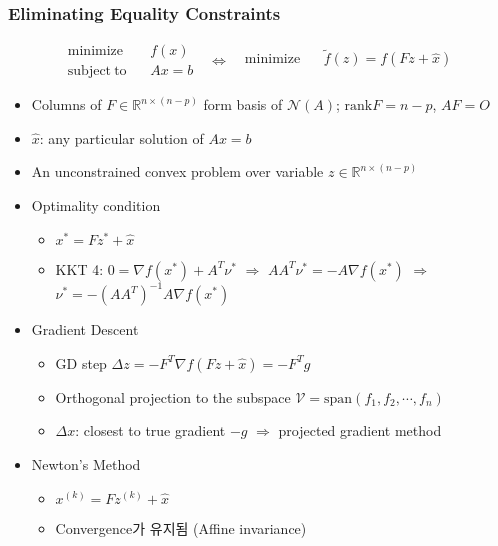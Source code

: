 \subsubsection*{Eliminating Equality Constraints}
$$ \begin{aligned}
    \mathrm{minimize}~~&~~f(x) \\
    \mathrm{subject~to}~~&~~Ax=b
\end{aligned}~~~\Leftrightarrow~~~\begin{aligned}
    \mathrm{minimize}~~&~~\tilde{f}(z)=f(Fz+\hat{x}) \\ {}
\end{aligned} $$
\begin{itemize}
    \item Columns of $F\in\mathbb{R}^{n\times(n-p)}$ form basis of $\mathcal{N}(A)$; $\mathrm{rank}F = n-p$, $AF=O$
    \item $\hat{x}$: any particular solution of $Ax=b$
    \item An unconstrained convex problem over variable $z\in\mathbb{R}^{n\times(n-p)}$
    \item Optimality condition
    \begin{itemize}
        \item $x^\ast=Fz^\ast+\hat{x}$
        \item KKT 4: $0=\nabla f(x^\ast)+A^T\nu^\ast$ $\Rightarrow$ $AA^T\nu^\ast=-A\nabla f(x^\ast)$ $\Rightarrow$ $\nu^\ast=-(AA^T)^{-1}A\nabla f(x^\ast)$
    \end{itemize}
    \item Gradient Descent
    \begin{itemize}
        \item GD step $\Delta z=-F^T\nabla f(Fz+\hat{x})=-F^Tg$
        \item Orthogonal projection to the subspace $\mathcal{V}=\mathrm{span}(f_1,f_2,\cdots,f_n)$
        \item $\Delta x$: closest to true gradient $-g$ $\Rightarrow$ projected gradient method
    \end{itemize}
    \item Newton's Method
    \begin{itemize}
        \item $x^{(k)}=Fz^{(k)}+\hat{x}$
        \item Convergence가 유지됨 (Affine invariance)
    \end{itemize}
\end{itemize}

